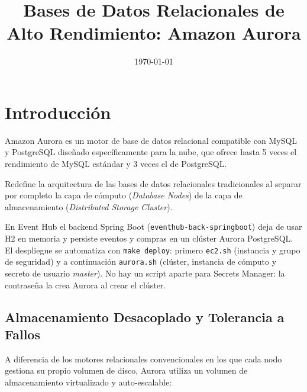 \documentclass[12pt,a4paper]{article}
\title{Bases de Datos Relacionales de Alto Rendimiento: Amazon Aurora}
\date{\normalsize\today}
\begin{document}
\maketitle

\begin{abstract}

\end{abstract}

{
\let\clearpage\relax
\tableofcontents
}
\newpage

\section{Introducción}

Amazon Aurora es un motor de base de datos relacional compatible con MySQL y PostgreSQL diseñado específicamente para la nube, que ofrece hasta 5 veces el rendimiento de MySQL estándar y 3 veces el de PostgreSQL.

Redefine la arquitectura de las bases de datos relacionales tradicionales al separar por completo la capa de cómputo (\textit{Database Nodes}) de la capa de almacenamiento (\textit{Distributed Storage Cluster}).

En Event Hub el backend Spring Boot (\texttt{eventhub-back-springboot}) deja de usar H2 en memoria y persiste eventos y compras en un clúster Aurora PostgreSQL. El despliegue se automatiza con \texttt{make deploy}: primero \texttt{ec2.sh} (instancia y grupo de seguridad) y a continuación \texttt{aurora.sh} (clúster, instancia de cómputo y secreto de usuario \textit{master}). No hay un script aparte para Secrets Manager: la contraseña la crea Aurora al crear el clúster.

\subsection{Almacenamiento Desacoplado y Tolerancia a Fallos}

A diferencia de los motores relacionales convencionales en los que cada nodo gestiona su propio volumen de disco, Aurora utiliza un volumen de almacenamiento virtualizado y auto-escalable:
\end{document}
